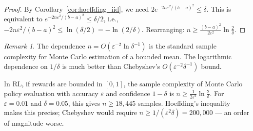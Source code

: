 \documentclass[11pt,a4paper]{article}
\theoremstyle{definition}
\theoremstyle{plain}
\theoremstyle{remark}
\newtheorem{remark}{Remark}[section]
\begin{document}
\begin{proof}
By Corollary~\ref{cor:hoeffding_iid}, we need $2e^{-2n\varepsilon^2/(b-a)^2} \leq \delta$.
This is equivalent to $e^{-2n\varepsilon^2/(b-a)^2} \leq \delta/2$, i.e.,
$-2n\varepsilon^2/(b-a)^2 \leq \ln(\delta/2) = -\ln(2/\delta)$.
Rearranging: $n \geq \frac{(b-a)^2}{2\varepsilon^2}\ln\frac{2}{\delta}$.
\end{proof}

\begin{remark}
The dependence $n = O(\varepsilon^{-2}\ln\delta^{-1})$ is the standard sample complexity
for Monte Carlo estimation of a bounded mean. The logarithmic dependence on $1/\delta$ is
much better than Chebyshev's $O(\varepsilon^{-2}\delta^{-1})$ bound.
\end{remark}

\begin{rlconnection}
In RL, if rewards are bounded in $[0, 1]$, the sample complexity of Monte Carlo policy
evaluation with accuracy $\varepsilon$ and confidence $1 - \delta$ is
$n \geq \frac{1}{2\varepsilon^2}\ln\frac{2}{\delta}$.
For $\varepsilon = 0.01$ and $\delta = 0.05$, this gives $n \geq 18{,}445$ samples.
Hoeffding's inequality makes this precise; Chebyshev would require
$n \geq 1/(\varepsilon^2 \delta) = 200{,}000$ --- an order of magnitude worse.
\end{rlconnection}
\end{document}
